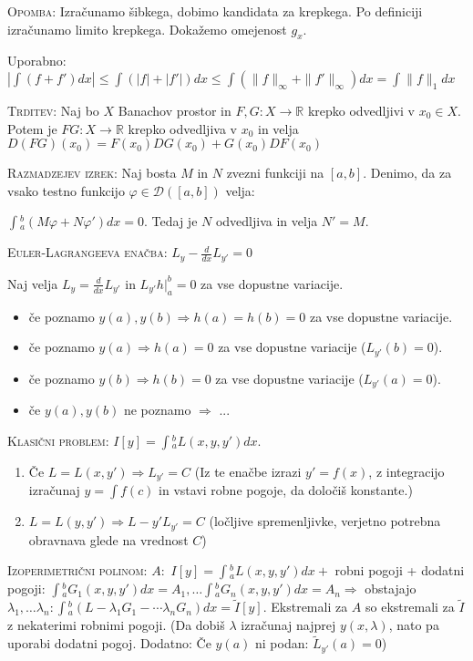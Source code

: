 \documentclass[8pt,a4paper]{amsart}
\theoremstyle{definition} %
\theoremstyle{plain} %
\let\oldint\int
\renewcommand{\int}{\oldint \!}
\newcommand{\R}{\mathbb R}
\begin{document}
\textsc{Opomba:} Izračunamo šibkega, dobimo kandidata za krepkega. Po definiciji
izračunamo limito krepkega. Dokažemo omejenost $g_x$.

Uporabno: $| \int (f+f')dx| \leq \int (|f|+|f'|)dx \leq \int (\|f\|_\infty + \|f'\|_\infty)dx = \int \|f\|_1dx$

\textsc{Trditev:} Naj bo $X$ Banachov prostor in $F,G:X \longrightarrow \R$
krepko odvedljivi v $x_0 \in X$. Potem je $F G:X \longrightarrow \R $ krepko
odvedljiva v $x_0$ in velja $D(FG)(x_0)=F(x_0)DG(x_0)+G(x_0)DF(x_0)$

\textsc{Razmadzejev izrek:} Naj bosta $M$ in $N$ zvezni funkciji na $[a,b]$.
Denimo, da za vsako testno funkcijo $\varphi \in \mathcal{D}([a,b])$ velja:

$
\int_a^b (M\varphi + N\varphi')dx = 0.
$
Tedaj je $N$ odvedljiva in velja $N'=M$.

\textsc{Euler-Lagrangeeva enačba:} $L_y - \frac{d}{dx}L_{y'}=0$

Naj velja $L_y=\frac{d}{dx}L_{y'}$ in $L_{y'}h |_a^b = 0$ za vse dopustne variacije.
\begin{itemize}
\item če poznamo $y(a),y(b) \Longrightarrow h(a)=h(b)=0$ za vse dopustne variacije.
\item če poznamo $y(a) \Longrightarrow h(a)=0$ za vse dopustne variacije ($L_{y'}(b)=0$).
\item če poznamo $y(b) \Longrightarrow h(b)=0$ za vse dopustne variacije ($L_{y'}(a)=0$).
\item če $y(a),y(b)$ ne poznamo $\Longrightarrow$ ...
\end{itemize}

\textsc{Klasični problem:} $I[y]=\int_a^bL(x,y,y')dx$.
\begin{enumerate}
\item Če $L=L(x,y') \Longrightarrow L_{y'}=C$ (Iz te enačbe izrazi $y' = f(x)$, z integracijo izračunaj $y = \int f(c) $ in vstavi robne pogoje, da določiš konstante.)
\item $L=L(y,y') \Longrightarrow L-y'L_{y'}=C$ (ločljive spremenljivke, verjetno potrebna obravnava glede na vrednost $C$)
\end{enumerate}

\textsc{Izoperimetrični polinom:} $A:$ $I[y]=\int_a^bL(x,y,y')dx +$ robni pogoji + dodatni pogoji: $\int_a^bG_1(x,y,y')dx = A_1, \ldots \int_a^bG_n(x,y,y')dx=A_n \Longrightarrow $ obstajajo $\lambda_1,\ldots \lambda_n: \int_a^b(L-\lambda_1G_1-\cdots \lambda_nG_n)dx = \tilde{I}[y]$. Ekstremali za $A$ so ekstremali za $\tilde{I}$ z nekaterimi robnimi pogoji. (Da dobiš $\lambda $ izračunaj najprej $y (x,\lambda)$, nato pa uporabi dodatni pogoj. Dodatno: Če $y(a)$ ni podan: $\tilde{L}_{y'}(a)=0$)
\\
\end{document}
